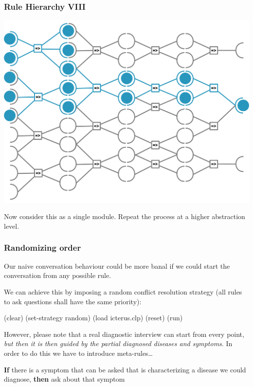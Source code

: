 \documentclass[xcolor={usenames,dvipsnames,svgnames}, compress]{beamer}
\begin{document}
\begin{frame}
  \frametitle{Rule Hierarchy VIII}
  \begin{center}
    \includegraphics[width=0.7\linewidth]{Figures/rulesact-VI}
  \end{center}
  Now consider this as a single module. Repeat the process at a
  higher abstraction level.
\end{frame}

\begin{frame}[fragile]
  \frametitle{Randomizing order}
  Our naive conversation behaviour could be more banal if we could
  start the conversation from any possible rule.\par\bigskip
  We can achieve this by imposing a random conflict resolution
  strategy (all rules to ask questions shall have the same priority):
  \begin{clips-code}
    (clear)
    (set-strategy random)
    (load icterus.clp)
    (reset)
    (run)
  \end{clips-code}

  However, please note that a real diagnostic interview can start from
  every point, \emph{but then it is then guided by
  the partial diagnosed diseases and symptoms}. In order to do this we
have to introduce meta-rules\dots\par\bigskip

  \textbf{If} there is a symptom that can be asked that is characterizing a
  disease we could diagnose, \textbf{then} ask about that symptom
\end{frame}

  
\end{document}
